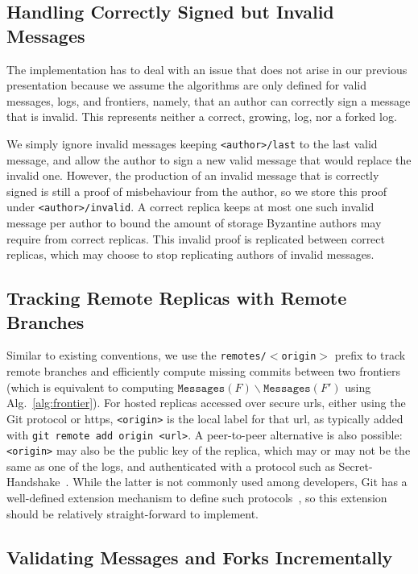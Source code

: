 \documentclass[9pt, oneside]{article}   	%
\begin{document}
\subsection{Handling Correctly Signed but Invalid Messages}

The implementation has to deal with an issue that does not arise in our previous presentation because we assume the algorithms are only defined for valid messages, logs, and frontiers, namely, that an author can correctly sign a message that is invalid. This represents neither a correct, growing, log, nor a forked log. 

We simply ignore invalid messages keeping \texttt{<author>/last} to the last valid message, and allow the author to sign a new valid message that would replace the invalid one. However, the production of an invalid message that is correctly signed is still a proof of misbehaviour from the author, so we store this proof under \texttt{<author>/invalid}. A correct replica keeps at most one such invalid message per author to bound the amount of storage Byzantine authors may require from correct replicas. This invalid proof is replicated between correct replicas, which may choose to stop replicating authors of invalid messages.


\subsection{Tracking Remote Replicas with Remote Branches}

Similar to existing conventions, we use the \texttt{remotes/$<$origin$>$} prefix to track remote branches and efficiently compute missing commits between two frontiers (which is equivalent to computing $\texttt{Messages}(F) \backslash \texttt{Messages}(F')$ using Alg.~\ref{alg:frontier}). For hosted replicas accessed over secure urls, either using the Git protocol or https, \texttt{<origin>} is the local label for that url, as typically added with \texttt{git remote add origin <url>}. A peer-to-peer alternative is also possible: \texttt{<origin>} may also be the public key of the replica, which may or may not be the same as one of the logs, and authenticated with a protocol such as Secret-Handshake~\cite{tarr2015shs}. While the latter is not commonly used among developers, Git has a well-defined extension mechanism to define such protocols~\cite{git-protocols}, so this extension should be relatively straight-forward to implement.

\subsection{Validating Messages and Forks Incrementally}
\end{document}
